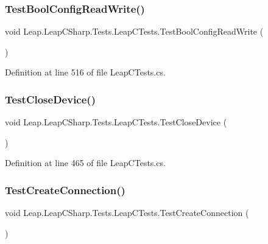 \subsubsection{\texorpdfstring{TestBoolConfigReadWrite()}{TestBoolConfigReadWrite()}}
{\footnotesize\ttfamily void Leap.\+Leap\+C\+Sharp.\+Tests.\+Leap\+C\+Tests.\+Test\+Bool\+Config\+Read\+Write (\begin{DoxyParamCaption}{ }\end{DoxyParamCaption})}



Definition at line 516 of file Leap\+C\+Tests.\+cs.

\mbox{\label{class_leap_1_1_leap_c_sharp_1_1_tests_1_1_leap_c_tests_abd6e8c308243d73ea8a0155ff7a149c8}} 
\subsubsection{\texorpdfstring{TestCloseDevice()}{TestCloseDevice()}}
{\footnotesize\ttfamily void Leap.\+Leap\+C\+Sharp.\+Tests.\+Leap\+C\+Tests.\+Test\+Close\+Device (\begin{DoxyParamCaption}{ }\end{DoxyParamCaption})}



Definition at line 465 of file Leap\+C\+Tests.\+cs.

\mbox{\label{class_leap_1_1_leap_c_sharp_1_1_tests_1_1_leap_c_tests_a69a66157f9ae366d500c44f6b41b548a}} 
\subsubsection{\texorpdfstring{TestCreateConnection()}{TestCreateConnection()}}
{\footnotesize\ttfamily void Leap.\+Leap\+C\+Sharp.\+Tests.\+Leap\+C\+Tests.\+Test\+Create\+Connection (\begin{DoxyParamCaption}{ }\end{DoxyParamCaption})}



